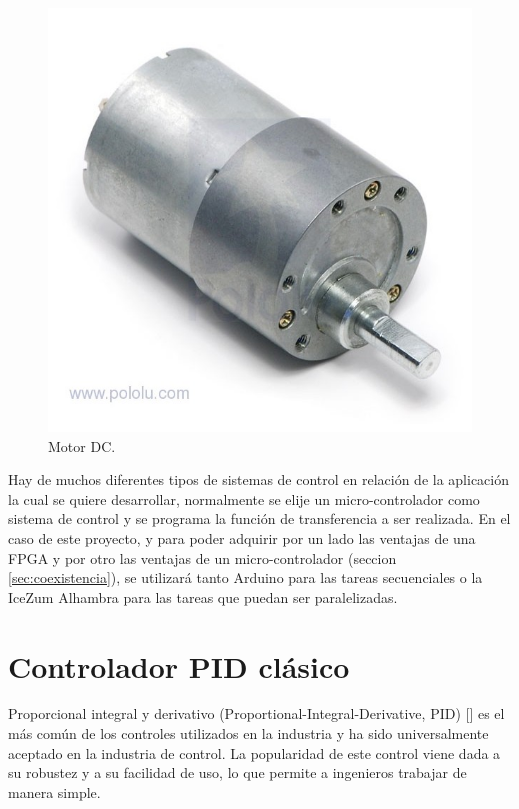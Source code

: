 \begin{center}
	\begin{figure}[H]
		\center
		\includegraphics[scale=0.4]{imagenes/EstadoArte/motor.jpg}
		\caption{Motor DC.}
		\label{fig:motor_DC}
	\end{figure}
\end{center}


Hay de muchos diferentes tipos de sistemas de control en relación de la aplicación la cual se quiere desarrollar, normalmente se elije un micro-controlador como sistema de control y se programa la función de transferencia a ser realizada.\newline
En el caso de este proyecto, y para poder adquirir por un lado las ventajas de una FPGA y por otro las ventajas de un micro-controlador (seccion \ref{sec:coexistencia}), se utilizará tanto Arduino para las tareas secuenciales o la IceZum Alhambra para las tareas que puedan ser paralelizadas. \newline
\section{Controlador PID clásico}\label{sec:PID}

Proporcional integral y derivativo (Proportional-Integral-Derivative, PID) [] es el más común de los controles utilizados en la industria y ha sido universalmente aceptado en la industria de control. La popularidad de este control viene dada a su robustez y a su facilidad de uso, lo que permite a ingenieros trabajar de manera simple. \newline

